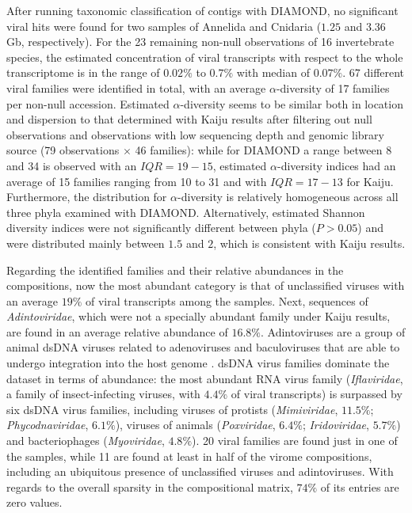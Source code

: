 \documentclass[
  openany]{book}
\begin{document}
After running taxonomic classification of contigs with DIAMOND, no significant viral hits were found for two samples of Annelida and Cnidaria (\(1.25\) and \(3.36\) Gb, respectively). For the 23 remaining non-null observations of 16 invertebrate species, the estimated concentration of viral transcripts with respect to the whole transcriptome is in the range of \(0.02\%\) to \(0.7\%\) with median of \(0.07\%\). 67 different viral families were identified in total, with an average \(\alpha\)-diversity of 17 families per non-null accession. Estimated \(\alpha\)-diversity seems to be similar both in location and dispersion to that determined with Kaiju results after filtering out null observations and observations with low sequencing depth and genomic library source (79 observations \(\times\) 46 families): while for DIAMOND a range between 8 and 34 is observed with an \(IQR = 19 - 15\), estimated \(\alpha\)-diversity indices had an average of 15 families ranging from 10 to 31 and with \(IQR = 17 - 13\) for Kaiju. Furthermore, the distribution for \(\alpha\)-diversity is relatively homogeneous across all three phyla examined with DIAMOND. Alternatively, estimated Shannon diversity indices were not significantly different between phyla (\(P > 0.05\)) and were distributed mainly between \(1.5\) and \(2\), which is consistent with Kaiju results.

Regarding the identified families and their relative abundances in the compositions, now the most abundant category is that of unclassified viruses with an average \(19\%\) of viral transcripts among the samples. Next, sequences of \emph{Adintoviridae}, which were not a specially abundant family under Kaiju results, are found in an average relative abundance of \(16.8\%\). Adintoviruses are a group of animal dsDNA viruses related to adenoviruses and baculoviruses that are able to undergo integration into the host genome \autocite{Starrett2021}. dsDNA virus families dominate the dataset in terms of abundance: the most abundant RNA virus family (\emph{Iflaviridae}, a family of insect-infecting viruses, with \(4.4\%\) of viral transcripts) is surpassed by six dsDNA virus families, including viruses of protists (\emph{Mimiviridae}, \(11.5\%\); \emph{Phycodnaviridae}, \(6.1\%\)), viruses of animals (\emph{Poxviridae}, \(6.4\%\); \emph{Iridoviridae}, \(5.7\%\)) and bacteriophages (\emph{Myoviridae}, \(4.8\%\)). 20 viral families are found just in one of the samples, while 11 are found at least in half of the virome compositions, including an ubiquitous presence of unclassified viruses and adintoviruses. With regards to the overall sparsity in the compositional matrix, \(74\%\) of its entries are zero values.
\end{document}
